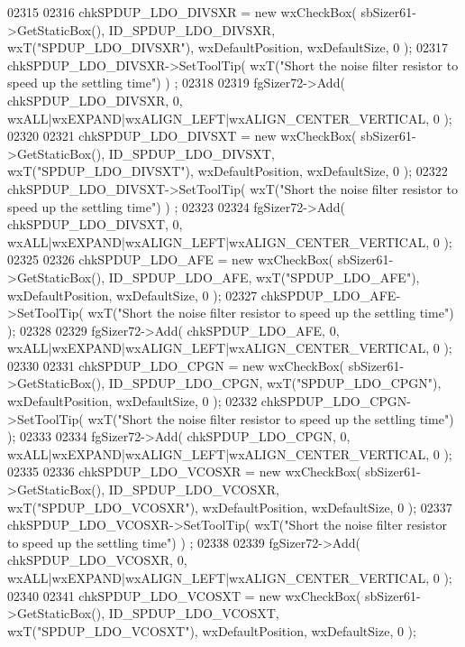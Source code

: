\begin{DoxyCode}
02315     
02316     chkSPDUP_LDO_DIVSXR = \textcolor{keyword}{new} wxCheckBox( sbSizer61->GetStaticBox(), 
      ID_SPDUP_LDO_DIVSXR, wxT(\textcolor{stringliteral}{"SPDUP\_LDO\_DIVSXR"}), wxDefaultPosition, wxDefaultSize, 0 );
02317     chkSPDUP_LDO_DIVSXR->SetToolTip( wxT(\textcolor{stringliteral}{"Short the noise filter resistor to speed up the settling time"}) )
      ;
02318     
02319     fgSizer72->Add( chkSPDUP_LDO_DIVSXR, 0, wxALL|wxEXPAND|wxALIGN\_LEFT|wxALIGN\_CENTER\_VERTICAL, 0 );
02320     
02321     chkSPDUP_LDO_DIVSXT = \textcolor{keyword}{new} wxCheckBox( sbSizer61->GetStaticBox(), 
      ID_SPDUP_LDO_DIVSXT, wxT(\textcolor{stringliteral}{"SPDUP\_LDO\_DIVSXT"}), wxDefaultPosition, wxDefaultSize, 0 );
02322     chkSPDUP_LDO_DIVSXT->SetToolTip( wxT(\textcolor{stringliteral}{"Short the noise filter resistor to speed up the settling time"}) )
      ;
02323     
02324     fgSizer72->Add( chkSPDUP_LDO_DIVSXT, 0, wxALL|wxEXPAND|wxALIGN\_LEFT|wxALIGN\_CENTER\_VERTICAL, 0 );
02325     
02326     chkSPDUP_LDO_AFE = \textcolor{keyword}{new} wxCheckBox( sbSizer61->GetStaticBox(), 
      ID_SPDUP_LDO_AFE, wxT(\textcolor{stringliteral}{"SPDUP\_LDO\_AFE"}), wxDefaultPosition, wxDefaultSize, 0 );
02327     chkSPDUP_LDO_AFE->SetToolTip( wxT(\textcolor{stringliteral}{"Short the noise filter resistor to speed up the settling time"}) );
02328     
02329     fgSizer72->Add( chkSPDUP_LDO_AFE, 0, wxALL|wxEXPAND|wxALIGN\_LEFT|wxALIGN\_CENTER\_VERTICAL, 0 );
02330     
02331     chkSPDUP_LDO_CPGN = \textcolor{keyword}{new} wxCheckBox( sbSizer61->GetStaticBox(), 
      ID_SPDUP_LDO_CPGN, wxT(\textcolor{stringliteral}{"SPDUP\_LDO\_CPGN"}), wxDefaultPosition, wxDefaultSize, 0 );
02332     chkSPDUP_LDO_CPGN->SetToolTip( wxT(\textcolor{stringliteral}{"Short the noise filter resistor to speed up the settling time"}) );
02333     
02334     fgSizer72->Add( chkSPDUP_LDO_CPGN, 0, wxALL|wxEXPAND|wxALIGN\_LEFT|wxALIGN\_CENTER\_VERTICAL, 0 );
02335     
02336     chkSPDUP_LDO_VCOSXR = \textcolor{keyword}{new} wxCheckBox( sbSizer61->GetStaticBox(), 
      ID_SPDUP_LDO_VCOSXR, wxT(\textcolor{stringliteral}{"SPDUP\_LDO\_VCOSXR"}), wxDefaultPosition, wxDefaultSize, 0 );
02337     chkSPDUP_LDO_VCOSXR->SetToolTip( wxT(\textcolor{stringliteral}{"Short the noise filter resistor to speed up the settling time"}) )
      ;
02338     
02339     fgSizer72->Add( chkSPDUP_LDO_VCOSXR, 0, wxALL|wxEXPAND|wxALIGN\_LEFT|wxALIGN\_CENTER\_VERTICAL, 0 );
02340     
02341     chkSPDUP_LDO_VCOSXT = \textcolor{keyword}{new} wxCheckBox( sbSizer61->GetStaticBox(), 
      ID_SPDUP_LDO_VCOSXT, wxT(\textcolor{stringliteral}{"SPDUP\_LDO\_VCOSXT"}), wxDefaultPosition, wxDefaultSize, 0 );

\end{DoxyCode}
